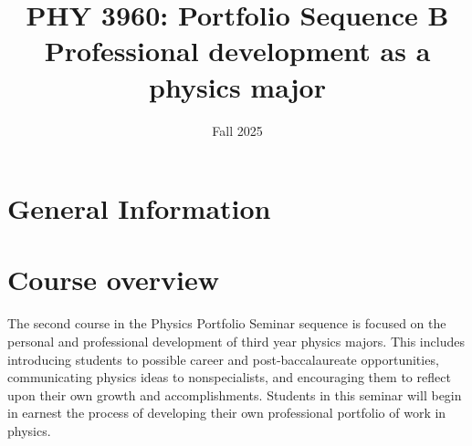 \documentclass{syllabus}
\begin{document}
\thispagestyle{fancy}
\date{Fall 2025}
\author{}
\title{PHY 3960: Portfolio Sequence B \\ {\large \mdseries Professional development as a physics major}}
\maketitle



\section*{General Information}


\section*{Course overview}

The second course in the Physics Portfolio Seminar sequence is focused on the personal and professional development of third year physics majors. This includes introducing students to possible career and post-baccalaureate opportunities, communicating physics ideas to nonspecialists, and encouraging them to reflect upon their own growth and accomplishments. Students in this seminar will begin in earnest the process of developing their own professional portfolio of work in physics.
\end{document}

